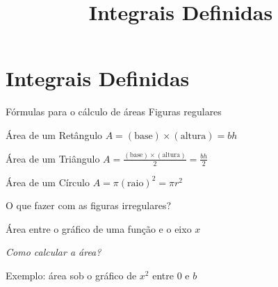 
\usepackage{integracao_e_series}

\title{Integrais Definidas}



\addtitle

\section{Integrais Definidas}

\begin{frame}{Fórmulas para o cálculo de áreas}
  Figuras regulares

  \pause
  \vspace{\baselineskip}
  Área de um Retângulo
  \tabto{45mm}
  \(
    A = (\text{base}) \times (\text{altura}) = bh
  \)

  \pause
  \vspace{\baselineskip}
  Área de um Triângulo
  \tabto{45mm}
  \(
    A = \frac{(\text{base}) \times (\text{altura})}{2} = \frac{bh}{2}
  \)

  \pause
  \vspace{0.9\baselineskip}
  Área de um Círculo
  \tabto{45mm}
  \(
    A = \pi (\text{raio})^2 = \pi r^2
  \)

  \pause
  \vspace{\baselineskip}
  O que fazer com as figuras irregulares?
\end{frame}

\begin{frame}{Área entre o gráfico de uma função e o eixo $x$}
  \centering
  \vspace{2\baselineskip}
  
  \pause
  \emph{Como calcular a área?}
\end{frame}

\begin{frame}{Exemplo: área sob o gráfico de $x^2$ entre 0 e $b$}
  \centering
  \vspace{2\baselineskip}
  
\end{frame}

